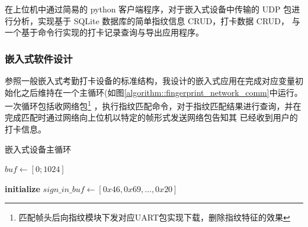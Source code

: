     在上位机中通过简易的 python 客户端程序，对于嵌入式设备中传输的 UDP 包进行分析，实现基于 SQLite 数据库的简单指纹信息 CRUD，打卡数据 CRUD，
    与一个基于命令行实现的打卡记录查询与导出应用程序。

    \subsubsection{嵌入式软件设计}

    参照一般嵌入式考勤打卡设备的标准结构，我设计的嵌入式应用在完成对应变量初始化之后维持在一个主循环(如图\ref{algorithm::fingerprint_network_comm}中运行。
    一次循环包括收网络包\footnote{匹配帧头后向指纹模块下发对应UART包实现下载，删除指纹特征的效果}
    ，执行指纹匹配命令，对于指纹匹配结果进行查询，并在完成匹配时通过网络向上位机以特定的帧形式发送网络包告知其
    已经收到用户的打卡信息。

    \begin{algorithm}[htb]
        \caption{嵌入式设备主循环}
        \label{algorithm::fingerprint_network_comm}
        \begin{algorithmic}[1]
         
             
                    \State {} 
                \EndIf
                \State $buf \gets [0; 1024]$ 
            \EndIf
        
            \State {} 

            \State {} 
            \State {} 
            
            \State {} 
        
              
                \State {} 
                
                    \State \textbf{initialize} $sign\_in\_buf \gets [0x46, 0x69, \ldots, 0x20]$ 
                    \State {} 
                    \State {}
                    \State {} 
                \EndIf
                \State {}
            \EndIf
        \EndWhile
        \end{algorithmic}
        \end{algorithm}
        

